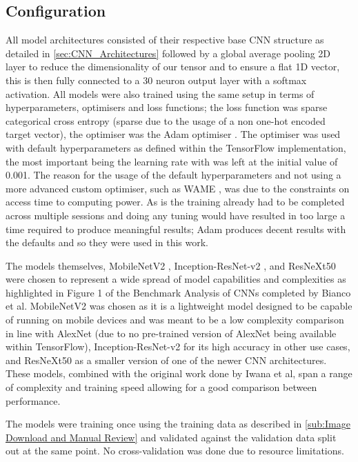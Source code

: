 \documentclass[12pt]{article}
\numberwithin{equation}{section}
\numberwithin{figure}{section}
\begin{document}
\subsection{Configuration} 
\label{sub:Configuration} 
All model architectures consisted of their respective base CNN structure as detailed in \cref{sec:CNN_Architectures} followed by a global average pooling 2D layer to reduce the dimensionality of our tensor and to ensure a flat 1D vector, this is then fully connected to a 30 neuron output layer with a softmax activation. All models were also trained using the same setup in terms of hyperparameters, optimisers and loss functions; the loss function was sparse categorical cross entropy (sparse due to the usage of a non one-hot encoded target vector), the optimiser was the Adam optimiser \cite{Kingma2015}. The optimiser was used with default hyperparameters as defined within the TensorFlow implementation, the most important being the learning rate with was left at the initial value of 0.001. The reason for the usage of the default hyperparameters and not using a more advanced custom optimiser, such as WAME \cite{Mosca2017}, was due to the constraints on access time to computing power. As is the training already had to be completed across multiple sessions and doing any tuning would have resulted in too large a time required to produce meaningful results; Adam produces decent results with the defaults and so they were used in this work.

The models themselves, MobileNetV2 \cite{Sandler2018}, Inception-ResNet-v2 \cite{Szegedy2016}, and ResNeXt50 \cite{Xie2016} were chosen to represent a wide spread of model capabilities and complexities as highlighted in Figure 1 of the Benchmark Analysis of CNNs completed by Bianco et al\cite{Bianco2018}. MobileNetV2 was chosen as it is a lightweight model designed to be capable of running on mobile devices and was meant to be a low complexity comparison in line with AlexNet (due to no pre-trained version of AlexNet being available within TensorFlow), Inception-ResNet-v2 for its high accuracy in other use cases, and ResNeXt50 as a smaller version of one of the newer CNN architectures. These models, combined with the original work done by Iwana et al, span a range of complexity and training speed allowing for a good comparison between performance.

The models were training once using the training data as described in \cref{sub:Image Download and Manual Review} and validated against the validation data split out at the same point. No cross-validation was done due to resource limitations.
\end{document}
